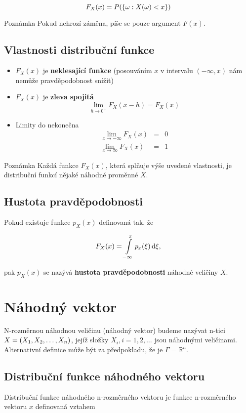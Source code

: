 	\[ F_X(x)=P(\brs{\omega:X(\omega)<x}) \]

	\begin{note}{Poznámka}
	Pokud nehrozí záměna, píše se pouze argument $F(x)$.
	\end{note}

	\subsection{Vlastnosti distribuční funkce}
	\begin{itemize}
	\item $F_X(x)$ je \textbf{neklesající funkce} (posouváním $x$ v intervalu $(-\infty,x)$ nám nemůže pravděpodobnost snížit)
	\item $F_X(x)$ je \textbf{zleva spojitá}
	\[ \lim_{h\to 0^+} F_X(x-h)=F_X(x) \]
	\item Limity do nekonečna
	\begin{eqnarray*}
	\lim_{x\to-\infty} F_X(x) & = & 0\\
	\lim_{x\to\infty} F_X(x) & = & 1
	\end{eqnarray*}
	\end{itemize}

	\begin{note}{Poznámka}
	Každá funkce $F_X(x)$, která splňuje výše uvedené vlastnosti, je distribuční funkcí nějaké náhodné proměnné $X$.
	\end{note}

	\subsection{Hustota pravděpodobnosti}
	Pokud existuje funkce $p_X(x)$ definovaná tak, že

	\[ F_X(x) = \int\limits_{-\infty}^x p_x(\xi)\d\xi, \]

	pak $p_X(x)$ se nazývá \textbf{hustota pravděpodobnosti} náhodné veličiny $X$.

	\section{Náhodný vektor}
	N-rozměrnou náhodnou veličinu (náhodný vektor) budeme nazývat n-tici $X=(\vecrow[X])$, jejíž složky $X_i, i=1,2,\ldots$ jsou náhodnými veličinami. Alternativní definice může být za předpokladu, že je $\Gamma=\mathbb{R}^n$.

	\subsection{Distribuční funkce náhodného vektoru}
	Distribuční funkce náhodného n-rozměrného vektoru je funkce n-rozměrného vektoru $x$ definovaná vztahem

